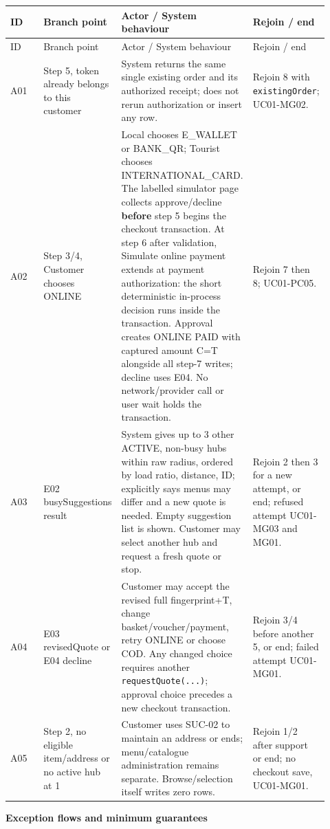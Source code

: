 \begin{longtable}{>{\raggedright\arraybackslash}p{0.2300\linewidth}>{\raggedright\arraybackslash}p{0.2300\linewidth}>{\raggedright\arraybackslash}p{0.2300\linewidth}>{\raggedright\arraybackslash}p{0.2300\linewidth}}
ID & Branch point & Actor / System behaviour & Rejoin / end \\
\hline\endfirsthead
ID & Branch point & Actor / System behaviour & Rejoin / end \\
\hline\endhead
A01 & Step 5, token already belongs to this customer & System returns the same single existing order and its authorized receipt; does not rerun authorization or insert any row. & Rejoin 8 with \texttt{existingOrder}; UC01-MG02. \\
A02 & Step 3/4, Customer chooses ONLINE & Local chooses E\_WALLET or BANK\_QR; Tourist chooses INTERNATIONAL\_CARD. The labelled simulator page collects approve/decline \textbf{before} step 5 begins the checkout transaction. At step 6 after validation, Simulate online payment extends at payment authorization: the short deterministic in-process decision runs inside the transaction. Approval creates ONLINE PAID with captured amount C=T alongside all step-7 writes; decline uses E04. No network/provider call or user wait holds the transaction. & Rejoin 7 then 8; UC01-PC05. \\
A03 & E02 busySuggestions result & System gives up to 3 other ACTIVE, non-busy hubs within raw radius, ordered by load ratio, distance, ID; explicitly says menus may differ and a new quote is needed. Empty suggestion list is shown. Customer may select another hub and request a fresh quote or stop. & Rejoin 2 then 3 for a new attempt, or end; refused attempt UC01-MG03 and MG01. \\
A04 & E03 revisedQuote or E04 decline & Customer may accept the revised full fingerprint+T, change basket/voucher/payment, retry ONLINE or choose COD. Any changed choice requires another \texttt{requestQuote(.\allowbreak{}.\allowbreak{}.\allowbreak{})}; approval choice precedes a new checkout transaction. & Rejoin 3/4 before another 5, or end; failed attempt UC01-MG01. \\
A05 & Step 2, no eligible item/address or no active hub at 1 & Customer uses SUC-02 to maintain an address or ends; menu/catalogue administration remains separate. Browse/selection itself writes zero rows. & Rejoin 1/2 after support or end; no checkout save, UC01-MG01. \\
\end{longtable}
\textbf{Exception flows and minimum guarantees}

